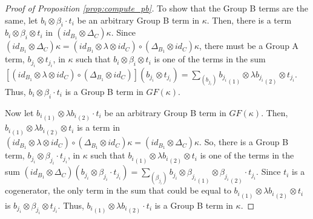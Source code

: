 \begin{proof}[Proof of Proposition \ref{prop:compute_pb}]
To show that the Group B terms 
are the same, let $b_i \otimes \beta_i \cdot t_i$ be 
an arbitrary Group B term in $\kappa$.
Then, there is a term $b_i \otimes \beta_i \otimes t_i$ 
in $(id_{B_1} \otimes \Delta_{C}) \kappa$. Since 
$(id_{B_1} \otimes \Delta_{C}) \kappa = 
(id_{B_1} \otimes \lambda \otimes id_C) \circ 
(\Delta_{B_1} \otimes id_C) \kappa$, 
there must be a Group A term, $b_{j_i} \otimes t_{j_i}$, 
in $\kappa$ such that $b_i \otimes \beta_i \otimes t_i$ 
is one of the terms in the sum 
$[(id_{B_1} \otimes \lambda \otimes id_C) \circ 
(\Delta_{B_1} \otimes id_C)] (b_{j_i} \otimes t_{j_i}) = 
\sum \limits_{(b_{j_i})} {b_{j_i}}_{(1)} \otimes 
\lambda {b_{j_i}}_{(2)} \otimes t_{j_i}$. Thus, 
$b_i \otimes \beta_i \cdot t_i$ is a Group B term in 
$GF(\kappa)$. 

Now let ${b_i}_{(1)} \otimes \lambda {b_i}_{(2)} 
\cdot t_i$ be an arbitrary Group B term in $GF(\kappa)$. 
Then, ${b_i}_{(1)} \otimes \lambda {b_i}_{(2)} \otimes t_i$ 
is a term in 
$(id_{B_1} \otimes \lambda \otimes id_C) \circ 
(\Delta_{B_1} \otimes id_C) \kappa = 
(id_{B_1} \otimes \Delta_{C}) \kappa 
$. So, there is a Group B term, $b_{j_i} \otimes 
\beta_{j_i} \cdot t_{j_i}$, in $\kappa$ such that 
${b_i}_{(1)} \otimes \lambda {b_i}_{(2)} 
\otimes t_i$ is one of the terms in the sum 
$(id_{B_1} \otimes \Delta_{C}) 
(b_{j_i} \otimes \beta_{j_i} \cdot t_{j_i}) = 
\sum \limits_{(\beta_{j_i})}
b_{j_i} \otimes {\beta_{j_i}}_{(1)} 
\otimes {\beta_{j_i}}_{(2)} \cdot t_{j_i}$. 
Since $t_i$ is a cogenerator, the only term in the sum 
that could be equal to ${b_i}_{(1)} \otimes 
\lambda {b_i}_{(2)} \otimes t_i$ is 
$b_{j_i} \otimes \beta_{j_i} \otimes t_{j_i}$. 
Thus, ${b_i}_{(1)} \otimes \lambda {b_i}_{(2)} 
\cdot t_i$ is a Group B term in $\kappa$.
\end{proof}